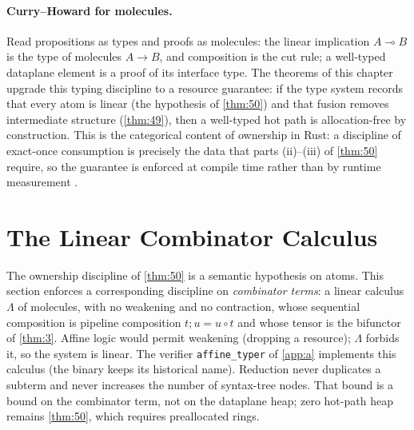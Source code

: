 \paragraph{Curry--Howard for molecules.}
Read propositions as types and proofs as molecules: the linear implication $A \multimap B$ is the type of molecules $A \to B$, and composition is the cut rule; a well-typed dataplane element is a proof of its interface type. The theorems of this chapter upgrade this typing discipline to a resource guarantee: if the type system records that every atom is linear (the hypothesis of \autoref{thm:50}) and that fusion removes intermediate structure (\autoref{thm:49}), then a well-typed hot path is allocation-free by construction. This is the categorical content of ownership in Rust: a discipline of exact-once consumption is precisely the data that parts (ii)--(iii) of \autoref{thm:50} require, so the guarantee is enforced at compile time rather than by runtime measurement \citep{wadler}.

\section{The Linear Combinator Calculus}\label{sec:linear-affine}

The ownership discipline of \autoref{thm:50} is a semantic hypothesis on atoms. This section enforces a corresponding discipline on \emph{combinator terms}: a linear calculus $\Lambda$ of molecules, with no weakening and no contraction, whose sequential composition is pipeline composition $t ; u = u \circ t$ and whose tensor is the bifunctor of \autoref{thm:3}. Affine logic would permit weakening (dropping a resource); $\Lambda$ forbids it, so the system is linear. The verifier \texttt{affine\_typer} of \autoref{app:a} implements this calculus (the binary keeps its historical name). Reduction never duplicates a subterm and never increases the number of syntax-tree nodes. That bound is a bound on the combinator term, not on the dataplane heap; zero hot-path heap remains \autoref{thm:50}, which requires preallocated rings.

